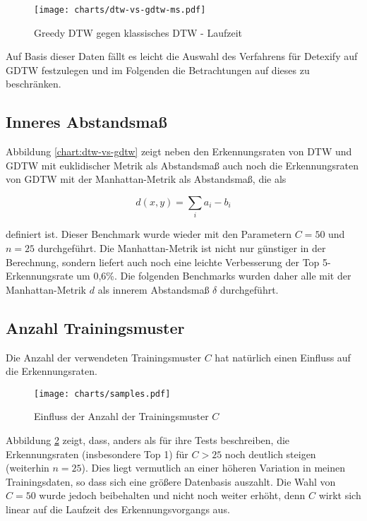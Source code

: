 \begin{figure}[htbp]
  \begin{center}
    \texttt{[image: charts/dtw-vs-gdtw-ms.pdf]}
  \end{center}
  \caption{Greedy DTW gegen klassisches DTW - Laufzeit}
  \label{chart:dtw-vs-gdtw-ms}
\end{figure}

Auf Basis dieser Daten fällt es leicht die Auswahl des Verfahrens für Detexify auf GDTW festzulegen und im Folgenden die Betrachtungen auf dieses zu beschränken.


\subsection{Inneres Abstandsmaß} %
\label{sub:inneres_abstandsmaß}

Abbildung \ref{chart:dtw-vs-gdtw} zeigt neben den Erkennungsraten von DTW und GDTW mit euklidischer Metrik als Abstandsmaß auch noch die Erkennungsraten von GDTW mit der Manhattan-Metrik als Abstandsmaß, die als

\[ d(x,y) = \sum_i a_i - b_i \]

definiert ist. Dieser Benchmark wurde wieder mit den Parametern $C=50$ und $n=25$ durchgeführt. Die Manhattan-Metrik ist nicht nur günstiger in der Berechnung, sondern liefert auch noch eine leichte Verbesserung der Top 5-Erkennungsrate um 0,6\%. Die folgenden Benchmarks wurden daher alle mit der Manhattan-Metrik $d$ als innerem Abstandsmaß $\delta$ durchgeführt.

\subsection{Anzahl Trainingsmuster} %
\label{sub:anzahl_trainingsmuster}

Die Anzahl der verwendeten Trainingsmuster $C$ hat natürlich einen Einfluss auf die Erkennungsraten.

\begin{figure}[htbp]
  \begin{center}
    \texttt{[image: charts/samples.pdf]}
  \end{center}
  \caption{Einfluss der Anzahl der Trainingsmuster $C$}
  \label{chart:samples}
\end{figure}

Abbildung \ref{chart:samples} zeigt, dass, anders als \citet{Golubitsky:2009p1842} für ihre Tests beschreiben, die Erkennungsraten (insbesondere Top 1) für $C > 25$ noch deutlich steigen (weiterhin $n=25$). Dies liegt vermutlich an einer höheren Variation in meinen Trainingsdaten, so dass sich eine größere Datenbasis auszahlt. Die Wahl von $C=50$ wurde jedoch beibehalten und nicht noch weiter erhöht, denn $C$ wirkt sich linear auf die Laufzeit des Erkennungsvorgangs aus.

